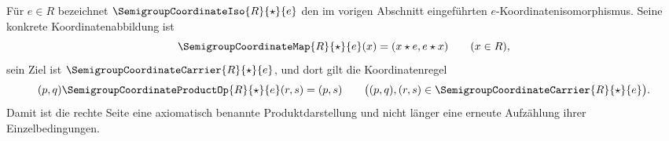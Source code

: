 \documentclass[main.tex]{subfiles}
\begin{document}

Für \(e\in R\) bezeichnet
\(\SemigroupCoordinateIso{R}{\star}{e}\) den im vorigen Abschnitt eingeführten
\(e\)-Koordinatenisomorphismus.  Seine konkrete Koordinatenabbildung ist
\[
  \SemigroupCoordinateMap{R}{\star}{e}(x)
  =(x\star e,e\star x)\qquad(x\in R),
\]
sein Ziel ist
\(\SemigroupCoordinateCarrier{R}{\star}{e}\), und dort gilt die
Koordinatenregel
\[
  (p,q)\SemigroupCoordinateProductOp{R}{\star}{e}(r,s)=(p,s)
  \qquad
  \bigl((p,q),(r,s)\in
    \SemigroupCoordinateCarrier{R}{\star}{e}\bigr).
\]
Damit ist die rechte Seite eine axiomatisch benannte Produktdarstellung
und nicht länger eine erneute Aufzählung ihrer Einzelbedingungen.
\end{document}
